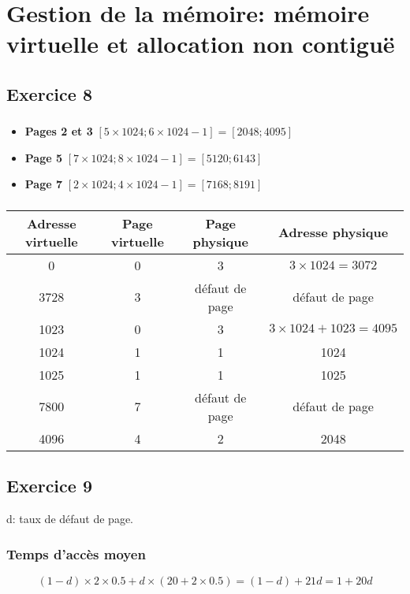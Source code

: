 \documentclass[12pt,a4paper,openany]{book}
\begin{document}
	\chapter{Gestion de la mémoire: mémoire virtuelle et allocation non contiguë}
		\section{Exercice 8}
		\subsection{}
		\begin{itemize}
			\item \textbf{Pages 2 et 3} $[5 \times 1024 ; 6 \times 1024 -1] = [2048 ; 4095]$ 
			\item \textbf{Page 5} $[7 \times 1024 ; 8 \times 1024 -1] = [5120 ; 6143]$
			\item \textbf{Page 7} $[2 \times 1024 ; 4 \times 1024 -1] = [7168 ; 8191]$
		\end{itemize}
		\subsection{}
		\begin{tabular}{c|c|c|c}
			\textbf{Adresse virtuelle} & \textbf{Page virtuelle} & \textbf{Page physique} & \textbf{Adresse physique}\\
			\hline
			0 &  0 & 3 & $3\times 1024=3072$\\
			3728 & 3 & défaut de page & défaut de page\\
			1023 & 0 & 3 & $3 \times 1024 + 1023 = 4095$\\ 
			1024 & 1 & 1 & 1024\\
			1025 & 1 & 1 & 1025\\
			7800 & 7 & défaut de page & défaut de page\\
			4096 & 4 & 2 & 2048
		\end{tabular}
		\section{Exercice 9}
		d: taux de défaut de page.

		\subsection{Temps d'accès moyen}
		$$(1-d) \times 2 \times 0.5 + d \times (20 + 2 \times 0.5) = (1-d)+21d = 1+20d$$
\end{document}
